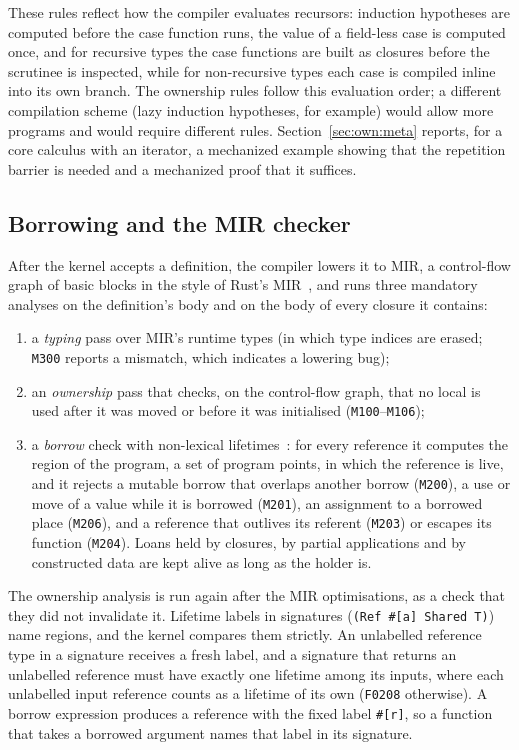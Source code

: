 These rules reflect how the compiler evaluates recursors: induction hypotheses are computed before the case function runs, the value of a field-less case is computed once, and for recursive types the case functions are built as closures before the scrutinee is inspected, while for non-recursive types each case is compiled inline into its own branch.
The ownership rules follow this evaluation order; a different compilation scheme (lazy induction hypotheses, for example) would allow more programs and would require different rules.
Section~\ref{sec:own:meta} reports, for a core calculus with an iterator, a mechanized example showing that the repetition barrier is needed and a mechanized proof that it suffices.

\subsection{Borrowing and the MIR checker}\label{sec:own:borrow}

After the kernel accepts a definition, the compiler lowers it to MIR, a control-flow graph of basic blocks in the style of Rust's MIR~\cite{rfc1211}, and runs three mandatory analyses on the definition's body and on the body of every closure it contains:
\begin{enumerate}\setlength\itemsep{1pt}
\item a \emph{typing} pass over MIR's runtime types (in which type indices are erased; \texttt{M300} reports a mismatch, which indicates a lowering bug);
\item an \emph{ownership} pass that checks, on the control-flow graph, that no local is used after it was moved or before it was initialised (\texttt{M100}--\texttt{M106});
\item a \emph{borrow} check with non-lexical lifetimes~\cite{rfc2094}: for every reference it computes the region of the program, a set of program points, in which the reference is live, and it rejects a mutable borrow that overlaps another borrow (\texttt{M200}), a use or move of a value while it is borrowed (\texttt{M201}), an assignment to a borrowed place (\texttt{M206}), and a reference that outlives its referent (\texttt{M203}) or escapes its function (\texttt{M204}).
Loans held by closures, by partial applications and by constructed data are kept alive as long as the holder is.
\end{enumerate}
The ownership analysis is run again after the MIR optimisations, as a check that they did not invalidate it.
Lifetime labels in signatures (\lstinline|(Ref #[a] Shared T)|) name regions, and the kernel compares them strictly.
An unlabelled reference type in a signature receives a fresh label, and a signature that returns an unlabelled reference must have exactly one lifetime among its inputs, where each unlabelled input reference counts as a lifetime of its own (\texttt{F0208} otherwise).
A borrow expression produces a reference with the fixed label \lstinline|#[r]|, so a function that takes a borrowed argument names that label in its signature.

